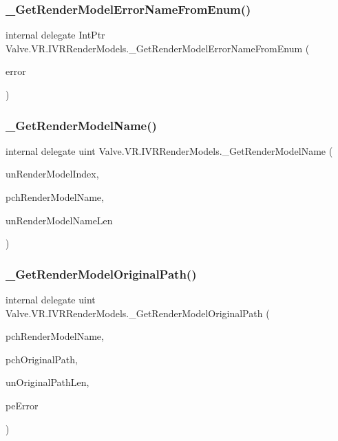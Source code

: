 \subsubsection{\texorpdfstring{\_GetRenderModelErrorNameFromEnum()}{\_GetRenderModelErrorNameFromEnum()}}
{\footnotesize\ttfamily internal delegate Int\+Ptr Valve.\+V\+R.\+I\+V\+R\+Render\+Models.\+\_\+\+Get\+Render\+Model\+Error\+Name\+From\+Enum (\begin{DoxyParamCaption}\item[{\mbox{\hyperlink{namespace_valve_1_1_v_r_ac95dda09bbb588fd83a8ac0ba3c82266}{E\+V\+R\+Render\+Model\+Error}}}]{error }\end{DoxyParamCaption})}

\mbox{\label{struct_valve_1_1_v_r_1_1_i_v_r_render_models_a82dc27ff6d6b45e1ef3957429bf65c1e}} 
\subsubsection{\texorpdfstring{\_GetRenderModelName()}{\_GetRenderModelName()}}
{\footnotesize\ttfamily internal delegate uint Valve.\+V\+R.\+I\+V\+R\+Render\+Models.\+\_\+\+Get\+Render\+Model\+Name (\begin{DoxyParamCaption}\item[{uint}]{un\+Render\+Model\+Index,  }\item[{System.\+Text.\+String\+Builder}]{pch\+Render\+Model\+Name,  }\item[{uint}]{un\+Render\+Model\+Name\+Len }\end{DoxyParamCaption})}

\mbox{\label{struct_valve_1_1_v_r_1_1_i_v_r_render_models_a894340b0300b94e37c1080e084555301}} 
\subsubsection{\texorpdfstring{\_GetRenderModelOriginalPath()}{\_GetRenderModelOriginalPath()}}
{\footnotesize\ttfamily internal delegate uint Valve.\+V\+R.\+I\+V\+R\+Render\+Models.\+\_\+\+Get\+Render\+Model\+Original\+Path (\begin{DoxyParamCaption}\item[{string}]{pch\+Render\+Model\+Name,  }\item[{System.\+Text.\+String\+Builder}]{pch\+Original\+Path,  }\item[{uint}]{un\+Original\+Path\+Len,  }\item[{ref \mbox{\hyperlink{namespace_valve_1_1_v_r_ac95dda09bbb588fd83a8ac0ba3c82266}{E\+V\+R\+Render\+Model\+Error}}}]{pe\+Error }\end{DoxyParamCaption})}

